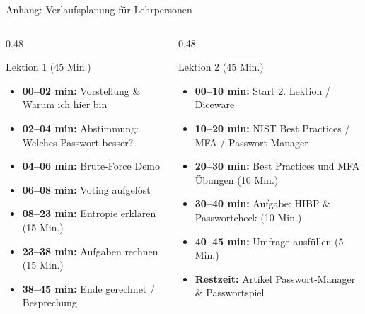 \documentclass[10pt, aspectratio=169]{beamer}
\begin{document}
\appendix
\begin{frame}{Anhang: Verlaufsplanung für Lehrpersonen}
  \begin{columns}[T]
    \begin{column}{0.48\textwidth}
      \begin{block}{Lektion 1 (45 Min.)}
        \small
        \begin{itemize}
          \item \textbf{00--02 min:} Vorstellung \& Warum ich hier bin
          \item \textbf{02--04 min:} Abstimmung: Welches Passwort besser?
          \item \textbf{04--06 min:} Brute-Force Demo
          \item \textbf{06--08 min:} Voting aufgelöst
          \item \textbf{08--23 min:} Entropie erklären (15 Min.)
          \item \textbf{23--38 min:} Aufgaben rechnen (15 Min.)
          \item \textbf{38--45 min:} Ende gerechnet / Besprechung
        \end{itemize}
      \end{block}
    \end{column}
    \begin{column}{0.48\textwidth}
      \begin{block}{Lektion 2 (45 Min.)}
        \small
        \begin{itemize}
          \item \textbf{00--10 min:} Start 2. Lektion / Diceware
          \item \textbf{10--20 min:} NIST Best Practices / MFA / Passwort-Manager
          \item \textbf{20--30 min:} Best Practices und MFA Übungen (10 Min.)
          \item \textbf{30--40 min:} Aufgabe: HIBP \& Passwortcheck (10 Min.)
          \item \textbf{40--45 min:} Umfrage ausfüllen (5 Min.)
          \item \textbf{Restzeit:}  Artikel Passwort-Manager \& Passwortspiel
        \end{itemize}
      \end{block}
    \end{column}
  \end{columns}
\end{frame}
\end{document}
